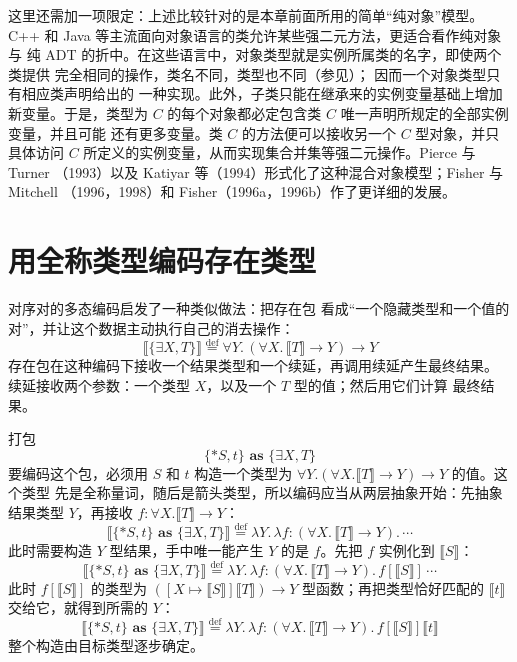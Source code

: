 这里还需加一项限定：上述比较针对的是本章前面所用的简单“纯对象”模型。
C++ 和 Java 等主流面向对象语言的类允许某些强二元方法，更适合看作纯对象与
纯 ADT 的折中。在这些语言中，对象类型就是实例所属类的名字，即使两个类提供
完全相同的操作，类名不同，类型也不同（参见）；
因而一个对象类型只有相应类声明给出的
一种实现。此外，子类只能在继承来的实例变量基础上增加新变量。于是，类型为
\(C\) 的每个对象都必定包含类 \(C\) 唯一声明所规定的全部实例变量，并且可能
还有更多变量。类 \(C\) 的方法便可以接收另一个 \(C\) 型对象，并只具体访问
\(C\) 所定义的实例变量，从而实现集合并集等强二元操作。Pierce 与 Turner
（1993）以及 Katiyar 等（1994）形式化了这种混合对象模型；Fisher 与 Mitchell
（1996，1998）和 Fisher（1996a，1996b）作了更详细的发展。

\section{用全称类型编码存在类型}
\label{sec:24.3}

对序对的多态编码启发了一种类似做法：把存在包
看成“一个隐藏类型和一个值的对”，并让这个数据主动执行自己的消去操作：
\[
\llbracket\{\exists X,T\}\rrbracket
\stackrel{\mathrm{def}}{=}\forall Y.\,(\forall X.\,\llbracket T\rrbracket\to Y)\to Y
\]
存在包在这种编码下接收一个结果类型和一个续延，再调用续延产生最终结果。
续延接收两个参数：一个类型 \(X\)，以及一个 \(T\) 型的值；然后用它们计算
最终结果。

打包
\[
\{*S,t\}\textbf{ as }\{\exists X,T\}
\]
要编码这个包，必须用 \(S\) 和 \(t\) 构造一个类型为
\(\forall Y.(\forall X.\llbracket T\rrbracket\to Y)\to Y\) 的值。这个类型
先是全称量词，随后是箭头类型，所以编码应当从两层抽象开始：先抽象结果类型
\(Y\)，再接收
\(f:\forall X.\llbracket T\rrbracket\to Y\)：
\[
\llbracket\{*S,t\}\textbf{ as }\{\exists X,T\}\rrbracket
\stackrel{\mathrm{def}}{=}
\lambda Y.\,\lambda f:(\forall X.\,\llbracket T\rrbracket\to Y).\,\cdots
\]
此时需要构造 \(Y\) 型结果，手中唯一能产生 \(Y\) 的是 \(f\)。先把
\(f\) 实例化到 \(\llbracket S\rrbracket\)：
\[
\llbracket\{*S,t\}\textbf{ as }\{\exists X,T\}\rrbracket
\stackrel{\mathrm{def}}{=}
\lambda Y.\,\lambda f:(\forall X.\,\llbracket T\rrbracket\to Y).\,
f[\llbracket S\rrbracket]\,\cdots
\]
此时 \(f[\llbracket S\rrbracket]\) 的类型为
\(([X\mapsto\llbracket S\rrbracket]
  \llbracket T\rrbracket)\to Y\) 型函数；再把类型恰好匹配的
\(\llbracket t\rrbracket\) 交给它，就得到所需的 \(Y\)：
\[
\llbracket\{*S,t\}\textbf{ as }\{\exists X,T\}\rrbracket
\stackrel{\mathrm{def}}{=}
\lambda Y.\,\lambda f:(\forall X.\,\llbracket T\rrbracket\to Y).\,
f[\llbracket S\rrbracket]\llbracket t\rrbracket
\]
整个构造由目标类型逐步确定。

